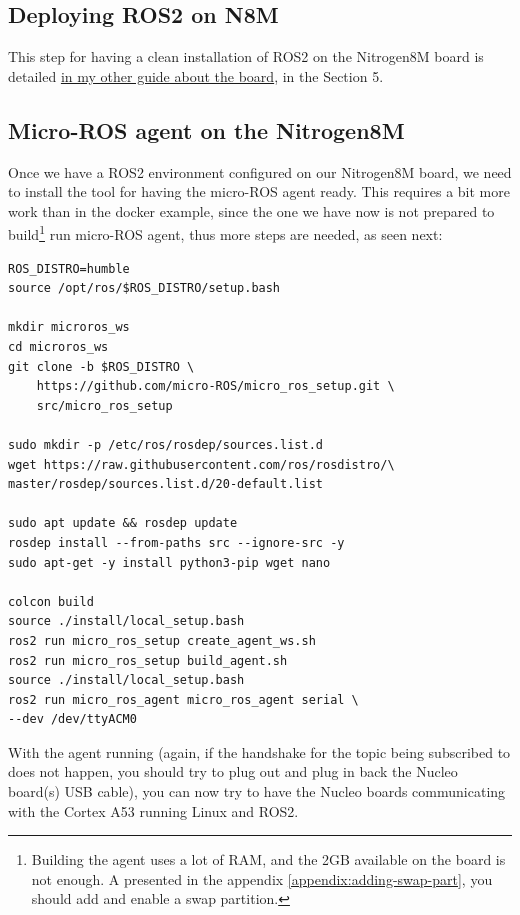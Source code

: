 \documentclass[10pt]{article}
\begin{document}
\subsection{Deploying ROS2 on N8M}
\label{sec:deploying-ros2-n8m}
This step for having a clean installation of ROS2 on the Nitrogen8M board is detailed \href{https://gitlab.com/nitrogen8m/documentation/}{in my other guide about the board}, in the Section 5.

\subsection{Micro-ROS agent on the Nitrogen8M}
\label{sec:micro-ros-agent}
Once we have a ROS2 environment configured on our Nitrogen8M board, we need to install the tool for having the micro-ROS agent ready.
This requires a bit more work than in the docker example, since the one we have now is not prepared to build\footnote{Building the agent uses a lot of RAM, and the 2GB available on the board is not enough. A presented in the appendix \ref{appendix:adding-swap-part}, you should add and enable a swap partition.} run micro-ROS agent, thus more steps are needed, as seen next:
\begin{tcolorbox}
\begin{verbatim}
ROS_DISTRO=humble
source /opt/ros/$ROS_DISTRO/setup.bash

mkdir microros_ws
cd microros_ws
git clone -b $ROS_DISTRO \
    https://github.com/micro-ROS/micro_ros_setup.git \
    src/micro_ros_setup

sudo mkdir -p /etc/ros/rosdep/sources.list.d
wget https://raw.githubusercontent.com/ros/rosdistro/\
master/rosdep/sources.list.d/20-default.list

sudo apt update && rosdep update
rosdep install --from-paths src --ignore-src -y
sudo apt-get -y install python3-pip wget nano

colcon build
source ./install/local_setup.bash
ros2 run micro_ros_setup create_agent_ws.sh
ros2 run micro_ros_setup build_agent.sh
source ./install/local_setup.bash
ros2 run micro_ros_agent micro_ros_agent serial \
--dev /dev/ttyACM0
\end{verbatim}
\end{tcolorbox}

With the agent running (again, if the handshake for the topic being subscribed to does not happen, you should try to plug out and plug in back the Nucleo board(s) USB cable), you can now try to have the Nucleo boards communicating with the Cortex A53 running Linux and ROS2.\\
\end{document}
